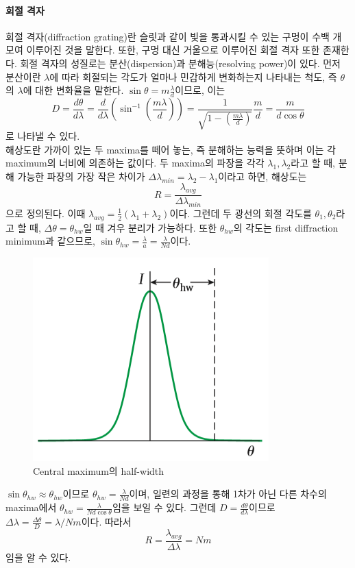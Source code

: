 \paragraph{회절 격자}
회절 격자(diffraction grating)란 슬릿과 같이 빛을 통과시킬 수 있는 구멍이 수백 개 모여 이루어진 것을 말한다. 또한, 구멍 대신 거울으로 이루어진 회절 격자 또한 존재한다. 회절 격자의 성질로는 분산(dispersion)과 분해능(resolving power)이 있다. 먼저 분산이란 $\lambda$에 따라 회절되는 각도가 얼마나 민감하게 변화하는지 나타내는 척도, 즉 $\theta$의 $\lambda$에 대한 변화율을 말한다. $\sin\theta = m\frac{\lambda}{d}$이므로, 이는
\begin{equation}
D=\frac{d\theta}{d\lambda}=\frac{d}{d\lambda}\left ( \sin^{-1}\left ( \frac{m\lambda}{d}\right )\right)=\frac{1}{\sqrt{1-(\frac{m\lambda}{d})}}\frac{m}{d}=\frac{m}{d\cos\theta}
\end{equation}
로 나타낼 수 있다. \\
해상도란 가까이 있는 두 maxima를 떼어 놓는, 즉 분해하는 능력을 뜻하며 이는 각 maximum의 너비에 의존하는 값이다. 두 maxima의 파장을 각각 $\lambda_1, \lambda_2$라고 할 때, 분해 가능한 파장의 가장 작은 차이가 $\Delta\lambda_{min}=\lambda_2-\lambda_1$이라고 하면, 해상도는
\begin{equation}
R=\frac{\lambda_{avg}}{\Delta \lambda_{min}}
\end{equation}
으로 정의된다. 이때 $\lambda_{avg}=\frac{1}{2}(\lambda_1+\lambda_2)$이다. 그런데 두 광선의 회절 각도를 $\theta_1, \theta_2$라고 할 때, $\Delta \theta = \theta_{hw}$일 때 겨우 분리가 가능하다. 또한 $\theta_{hw}$의 각도는 first diffraction minimum과 같으므로, $\sin\theta_{hw}=\frac{\lambda}{a}=\frac{\lambda}{Nd}$이다. 
\begin{figure}[h]
\centering\includegraphics[scale=0.5]{Pictures/resolving_power.png}
\caption{Central maximum의 half-width}
\label{fig:diffslit}
\end{figure}
$\sin\theta_{hw}\approx \theta_{hw}$이므로 $\theta_{hw} = \frac{\lambda}{Nd}$이며, 일련의 과정을 통해 1차가 아닌 다른 차수의 maxima에서 $\theta_{hw} = \frac{\lambda}{Nd\cos\theta}$임을 보일 수 있다. 그런데 $D=\frac{d\theta}{d\lambda}$이므로 $\Delta\lambda=\frac{\Delta \theta}{D}=\lambda/Nm$이다. 따라서
\begin{equation}
R=\frac{\lambda_{avg}}{\Delta \lambda}=Nm
\end{equation}
임을 알 수 있다.
